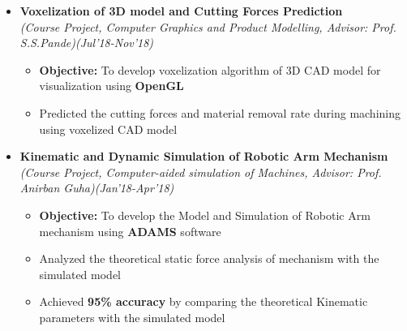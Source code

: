 \documentclass[a4paper,10pt]{article}
\begin{document}
\begin{itemize}
\item \textbf{Voxelization of 3D model and Cutting Forces Prediction}\\
\emph{(Course Project, Computer Graphics and Product Modelling, Advisor: Prof. S.S.Pande)\hfill (Jul'18-Nov’18)} \\[-0.4cm]
	\begin{itemize}[noitemsep,nolistsep]
    \item \textbf{Objective:} To develop voxelization algorithm of 3D CAD model for visualization using \textbf{OpenGL}
    \item Predicted the cutting forces and material removal rate during machining using voxelized CAD model
	\end{itemize}
	
\item \textbf{Kinematic and Dynamic Simulation of Robotic Arm Mechanism} \\
\emph{(Course Project, Computer-aided simulation of Machines, Advisor: Prof. Anirban Guha)\hfill (Jan’18-Apr'18)} \\[-0.4cm]
	\begin{itemize}[noitemsep,nolistsep]
    \item \textbf{Objective:} To develop the Model and Simulation of Robotic Arm mechanism using \textbf{ADAMS} software
    \item Analyzed the theoretical static force analysis of mechanism with the simulated model
    \item Achieved \textbf{95\% accuracy} by comparing the theoretical Kinematic parameters with the simulated model
	\end{itemize}


\end{itemize}
\end{document}
